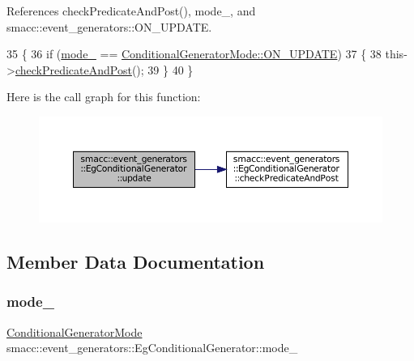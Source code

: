 References check\+Predicate\+And\+Post(), mode\+\_\+, and smacc\+::event\+\_\+generators\+::\+O\+N\+\_\+\+U\+P\+D\+A\+TE.


\begin{DoxyCode}
35         \{
36             \textcolor{keywordflow}{if} (\hyperlink{classsmacc_1_1event__generators_1_1EgConditionalGenerator_a5f3e7b602c4d250c54bec0d681d2cb80}{mode\_} == \hyperlink{namespacesmacc_1_1event__generators_a1a57548759d7458f91c299f4fc2c5ea4a4a6be4c8602d150038b100a35556d3d7}{ConditionalGeneratorMode::ON\_UPDATE})
37             \{
38                 this->\hyperlink{classsmacc_1_1event__generators_1_1EgConditionalGenerator_a2a7e8a3818ffd1899682be9bbb8ae339}{checkPredicateAndPost}();
39             \}
40         \}
\end{DoxyCode}
Here is the call graph for this function\+:
\nopagebreak
\begin{figure}[H]
\begin{center}
\leavevmode
\includegraphics[width=350pt]{classsmacc_1_1event__generators_1_1EgConditionalGenerator_ab5e500fd01fb21a7e6b836405431c6f2_cgraph}
\end{center}
\end{figure}


\subsection{Member Data Documentation}
\mbox{\label{classsmacc_1_1event__generators_1_1EgConditionalGenerator_a5f3e7b602c4d250c54bec0d681d2cb80}} 
\subsubsection{\texorpdfstring{mode\+\_\+}{mode\_}}
{\footnotesize\ttfamily \hyperlink{namespacesmacc_1_1event__generators_a1a57548759d7458f91c299f4fc2c5ea4}{Conditional\+Generator\+Mode} smacc\+::event\+\_\+generators\+::\+Eg\+Conditional\+Generator\+::mode\+\_\+}



